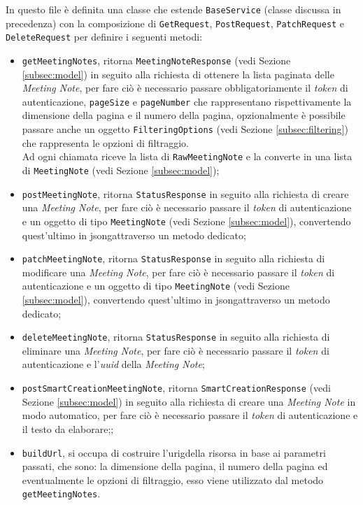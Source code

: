 In questo file è definita una classe che estende \lstinline{BaseService} (classe discussa in precedenza) con la composizione di \lstinline{GetRequest}, \lstinline{PostRequest}, \lstinline{PatchRequest} e \lstinline{DeleteRequest} per definire i seguenti metodi:
\begin{itemize}
    \item \lstinline{getMeetingNotes}, ritorna \lstinline{MeetingNoteResponse} (vedi Sezione \ref{subsec:model}) in seguito alla richiesta di ottenere la lista paginata delle \emph{Meeting Note}, per fare ciò è necessario passare obbligatoriamente il \emph{token} di autenticazione, \lstinline{pageSize} e \lstinline{pageNumber} che rappresentano rispettivamente la dimensione della pagina e il numero della pagina, opzionalmente è possibile passare anche un oggetto \lstinline{FilteringOptions} (vedi Sezione \ref{subsec:filtering}) che rappresenta le opzioni di filtraggio. \\
    Ad ogni chiamata riceve la lista di \lstinline{RawMeetingNote} e la converte in una lista di \lstinline{MeetingNote} (vedi Sezione \ref{subsec:model});
    \item \lstinline{postMeetingNote}, ritorna \lstinline{StatusResponse} in seguito alla richiesta di creare una \emph{Meeting Note}, per fare ciò è necessario passare il \emph{token} di autenticazione e un oggetto di tipo \lstinline{MeetingNote} (vedi Sezione \ref{subsec:model}), convertendo quest'ultimo in \gls{jsong}\glsoccur attraverso un metodo dedicato;
    \item \lstinline{patchMeetingNote}, ritorna \lstinline{StatusResponse} in seguito alla richiesta di modificare una \emph{Meeting Note}, per fare ciò è necessario passare il \emph{token} di autenticazione e un oggetto di tipo \lstinline{MeetingNote} (vedi Sezione \ref{subsec:model}), convertendo quest'ultimo in \gls{jsong}\glsoccur attraverso un metodo dedicato;
    \item \lstinline{deleteMeetingNote}, ritorna \lstinline{StatusResponse} in seguito alla richiesta di eliminare una \emph{Meeting Note}, per fare ciò è necessario passare il \emph{token} di autenticazione e l'\emph{uuid} della \emph{Meeting Note};
    \item \lstinline{postSmartCreationMeetingNote}, ritorna \lstinline{SmartCreationResponse} (vedi Sezione \ref{subsec:model}) in seguito alla richiesta di creare una \emph{Meeting Note} in modo automatico, per fare ciò è necessario passare il \emph{token} di autenticazione e il testo da elaborare;;
    \item \lstinline{buildUrl}, si occupa di costruire l'\gls{urig}\glsoccur della risorsa in base ai parametri passati, che sono: la dimensione della pagina, il numero della pagina ed eventualmente le opzioni di filtraggio, esso viene utilizzato dal metodo \lstinline{getMeetingNotes}.
\end{itemize}

